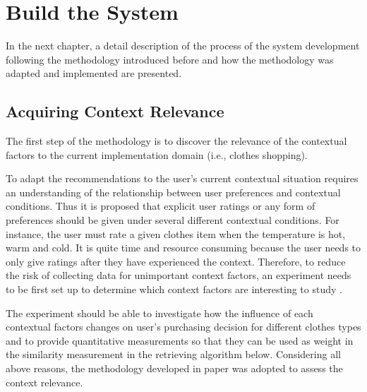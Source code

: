 \chapter{Build the System}\label{chapter:build}

In the next chapter, a detail description of the process of the system development following the methodology introduced before and how the methodology was adapted and implemented are presented. 

\section{Acquiring Context Relevance} \label{sec:acr}

The first step of the methodology is to discover the relevance of the contextual factors to the current implementation domain (i.e., clothes shopping). 

To adapt the recommendations to the user's current contextual situation requires an understanding of the relationship between user preferences and contextual conditions. Thus it is proposed that explicit user ratings or any form of preferences should be given under several different contextual conditions. For instance, the user must rate a given clothes item when the temperature is hot, warm and cold. It is quite time and resource consuming because the user needs to only give ratings after they have experienced the context. Therefore, to reduce the risk of collecting data for unimportant context factors, an experiment needs to be first set up to determine which context factors are interesting to study \cite{ref:18}. 

The experiment should be able to investigate how the influence of each contextual factors changes on user's purchasing decision for different clothes types and to provide quantitative measurements so that they can be used as weight in the similarity measurement in the retrieving algorithm below. Considering all above reasons, the methodology developed in paper \cite{ref:18} was adopted to assess the context relevance.

